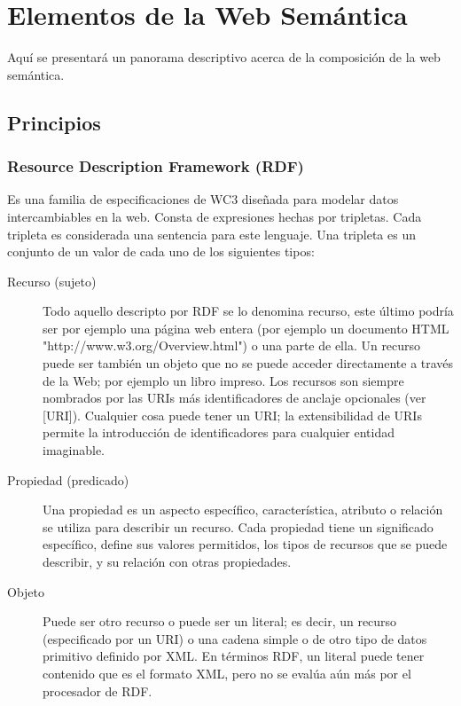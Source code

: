 \chapter{Elementos de la Web Semántica}
\label{chapter:semanticwebelements}

Aquí se presentará un panorama descriptivo acerca de la composición de la web semántica.

\section{Principios}

\subsection{Resource Description Framework (RDF)}

Es una familia de especificaciones de WC3 diseñada para modelar datos intercambiables en la web. 
Consta de expresiones hechas por tripletas. Cada tripleta es considerada una sentencia para este lenguaje.
Una tripleta es un conjunto de un valor de cada uno de los siguientes tipos:

\begin{description}
 \item[Recurso (sujeto)] Todo aquello descripto por RDF se lo denomina recurso, este último podría ser por ejemplo una página web entera (por ejemplo 
un documento HTML "http://www.w3.org/Overview.html") o una parte de ella.  Un recurso puede ser también un objeto que no 
se puede acceder directamente a través de la Web; por ejemplo un libro impreso. Los recursos son siempre nombrados por las 
URIs más identificadores de anclaje opcionales (ver [URI]). Cualquier cosa puede tener un URI; la extensibilidad de URIs 
permite la introducción de identificadores para cualquier entidad imaginable.
 \item[Propiedad (predicado)] Una propiedad es un aspecto específico, característica, atributo o relación se utiliza para describir un recurso. 
Cada propiedad tiene un significado específico, define sus valores permitidos, los tipos de recursos que se puede describir, 
y su relación con otras propiedades. 
 \item[Objeto] Puede ser otro recurso o puede ser un literal; es decir, un recurso (especificado por un URI) o una cadena simple o 
de otro tipo de datos primitivo definido por XML. En términos RDF, un literal puede tener contenido que es el formato XML,
pero no se evalúa aún más por el procesador de RDF.
\end{description}


